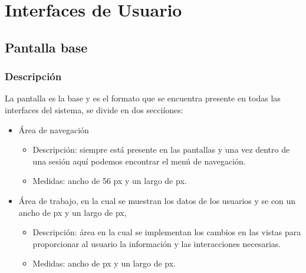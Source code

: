 \chapter{Interfaces de Usuario}
\label{cap:Pantallas}

 \newpage
\section{Pantalla base}

\subsection{Descripción}
La pantalla es la base y es el formato que se encuentra presente en todas las interfaces del sistema, se divide en dos secciíones:
\begin{itemize}
    \item Área de navegación
    \begin{itemize}
        \item Descripción: siempre está presente en las pantallas y una vez dentro de una sesión aquí podemos encontrar el menú de navegación.
        \item Medidas: ancho de 56 px y un largo de px.
    \end{itemize}

    \item Área de trabajo, en la cual se muestran los datos de los usuarios y se  con un ancho de px y un largo de px, 
    \begin{itemize}
        \item Descripción: área en la cual se implementan los cambios en las vistas para proporcionar al usuario la información y las interacciones necesarias.
        \item Medidas: ancho de  px y un largo de px. 
    \end{itemize}
\end{itemize}
%


 












